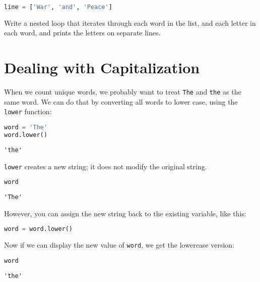 \begin{lstlisting}[language=Python,style=source]
line = ['War', 'and', 'Peace']
\end{lstlisting}

Write a nested loop that iterates through each word in the list, and
each letter in each word, and prints the letters on separate lines.

\section{Dealing with Capitalization}\label{dealing-with-capitalization}

When we count unique words, we probably want to treat
\passthrough{\lstinline!The!} and \passthrough{\lstinline!the!} as the
same word. We can do that by converting all words to lower case, using
the \passthrough{\lstinline!lower!} function:

\begin{lstlisting}[language=Python,style=source]
word = 'The'
word.lower()
\end{lstlisting}

\begin{lstlisting}[style=output]
'the'
\end{lstlisting}

\passthrough{\lstinline!lower!} creates a new string; it does not modify
the original string.

\begin{lstlisting}[language=Python,style=source]
word
\end{lstlisting}

\begin{lstlisting}[style=output]
'The'
\end{lstlisting}

However, you can assign the new string back to the existing variable,
like this:

\begin{lstlisting}[language=Python,style=source]
word = word.lower()
\end{lstlisting}

Now if we can display the new value of \passthrough{\lstinline!word!},
we get the lowercase version:

\begin{lstlisting}[language=Python,style=source]
word
\end{lstlisting}

\begin{lstlisting}[style=output]
'the'
\end{lstlisting}

